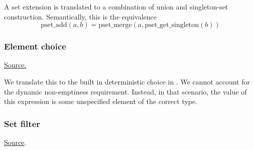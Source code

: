 
\begin{mathpar}
\end{mathpar}
A set extension is translated to a combination of union and singleton-set construction. Semantically, this is the equivalence
\[
\mathrm{pset\_add}(a,b) = \mathrm{pset\_merge}(a, \mathrm{pset\_get\_singleton}(b))
\]

\subsubsection{Element choice}
\href{https://github.com/saltiniroberto/ssf/blob/7ea6e18093d9da3154b4e396dd435549f687e6b9/high_level/common/pythonic_code_generic.py#L58-L60}{Source.}



\begin{mathpar}
\end{mathpar}
We translate this to the built in deterministic choice in \tlap{}. We cannot account for the dynamic non-emptiness requirement. Instead, in that scenario, the value of this expression is some unspecified element of the correct type.

\subsubsection{Set filter}
\href{https://github.com/saltiniroberto/ssf/blob/7ea6e18093d9da3154b4e396dd435549f687e6b9/high_level/common/pythonic_code_generic.py#L63-L70}{Source}.



